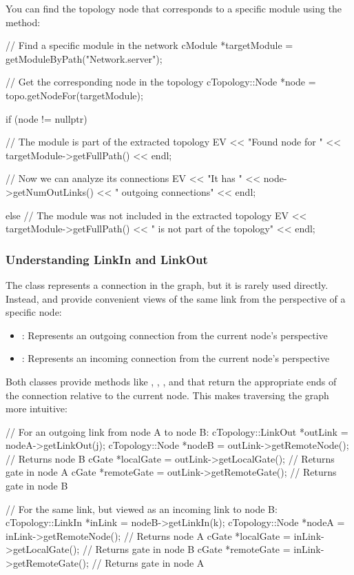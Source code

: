 You can find the topology node that corresponds to a specific module using the
 method:

\begin{cpp}
// Find a specific module in the network
cModule *targetModule = getModuleByPath("Network.server");

// Get the corresponding node in the topology
cTopology::Node *node = topo.getNodeFor(targetModule);

if (node != nullptr) {
    // The module is part of the extracted topology
    EV << "Found node for " << targetModule->getFullPath() << endl;

    // Now we can analyze its connections
    EV << "It has " << node->getNumOutLinks() << " outgoing connections" << endl;
} else {
    // The module was not included in the extracted topology
    EV << targetModule->getFullPath() << " is not part of the topology" << endl;
}
\end{cpp}

\subsubsection{Understanding LinkIn and LinkOut}
\label{sec:sim-lib:ctopology-link-types}

The  class represents a connection in the graph, but
it is rarely used directly. Instead,  and
 provide convenient views of the same link from the
perspective of a specific node:

\begin{itemize}
  \item {}: Represents an outgoing connection from the current node's perspective
  \item {}: Represents an incoming connection from the current node's perspective
\end{itemize}

Both classes provide methods like ,
, , and 
that return the appropriate ends of the connection relative to the current node.
This makes traversing the graph more intuitive:

\begin{cpp}
// For an outgoing link from node A to node B:
cTopology::LinkOut *outLink = nodeA->getLinkOut(j);
cTopology::Node *nodeB = outLink->getRemoteNode();  // Returns node B
cGate *localGate = outLink->getLocalGate();         // Returns gate in node A
cGate *remoteGate = outLink->getRemoteGate();       // Returns gate in node B

// For the same link, but viewed as an incoming link to node B:
cTopology::LinkIn *inLink = nodeB->getLinkIn(k);
cTopology::Node *nodeA = inLink->getRemoteNode();   // Returns node A
cGate *localGate = inLink->getLocalGate();          // Returns gate in node B
cGate *remoteGate = inLink->getRemoteGate();        // Returns gate in node A
\end{cpp}

